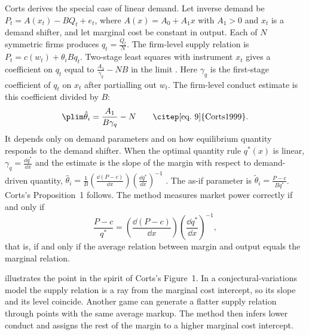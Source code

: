 Corts derives the special case of linear demand. Let inverse demand be $P_t = A(x_t) - BQ_t + e_t$, where $A(x) = A_0 +
A_1 x$ with $A_1 > 0$ and $x_t$ is a demand shifter, and let marginal cost be constant in output. Each of $N$ symmetric
firms produces $q_t = \frac{Q_t}{N}$. The firm-level supply relation is $P_t = c(w_t) + \theta_i B q_t$. Two-stage least
squares with instrument $x_t$ gives a coefficient on $q_t$ equal to $\frac{A_1}{\gamma_q} - NB$ in the limit
\citep[eqs.~7--8]{Corts1999}. Here $\gamma_q$ is the first-stage coefficient of $q_t$ on $x_t$ after partialling out
$w_t$. The
firm-level conduct estimate is this coefficient divided by $B$:
\begin{equation*}
\plim\hat\theta_i = \frac{A_1}{B\gamma_q} - N \qquad \text{\citep[eq.~9]{Corts1999}}.
\end{equation*}
It depends only on demand parameters and on how equilibrium quantity responds to the demand shifter. When the optimal
quantity rule $q^*(x)$ is linear, $\gamma_q = \frac{\dd q^*}{\dd x}$ and the estimate is the slope of the margin with respect to
demand-driven quantity, $\hat\theta_i = \frac{1}{B}\left(\frac{\dd(P - c)}{\dd x}\right)\left(\frac{\dd q^*}{\dd x}\right)^{-1}$ \citep[eq.~10]{Corts1999}. The as-if
parameter is $\tilde\theta_i = \frac{P - c}{Bq^*}$. Corts's Proposition~1 follows. The method measures market power
correctly if and only if
\begin{equation*}
\frac{P - c}{q^*} = \left(\frac{\dd(P - c)}{\dd x}\right)\left(\frac{\dd q^*}{\dd x}\right)^{-1} ,
\end{equation*}
that is, if and only if the average relation between margin and output equals the marginal relation.

 illustrates the point in the spirit of Corts's Figure~1. In a conjectural-variations model the
supply relation is a ray from the marginal cost intercept, so its slope and its level coincide. Another game can generate
a flatter supply relation through points with the same average markup. The method then infers lower conduct and assigns
the rest of the margin to a higher marginal cost intercept.

